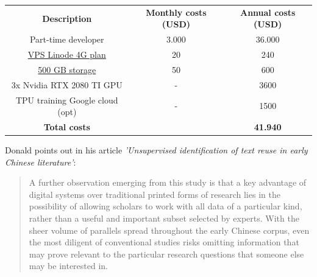 \begin{tabular}{ c c c }
 \textbf{Description} & \textbf{Monthly costs (USD)} & \textbf{Annual costs (USD)} \\ 
 Part-time developer & 3.000 & 36.000 \\  
 \href{https://www.linode.com/pricing}{VPS Linode 4G plan} & 20 & 240 \\
  \href{https://www.linode.com/blockstorage}{500 GB storage} & 50 & 600 \\
  3x Nvidia RTX 2080 TI GPU & - & 3600 \\
  TPU training Google cloud (opt) & - & 1500 \\
 \textbf{Total costs} & & \textbf{41.940}
\end{tabular}


Donald \cite{sturgeon2017} points out in his article {\em 'Unsupervised identification of text reuse in early Chinese literature'}: 

\begin{quote}
A further observation emerging from this study is that a key advantage of digital systems over traditional printed forms of research lies in the possibility of allowing scholars to work with all data of a particular kind, rather than a useful and important subset selected by experts. With the sheer volume of parallels spread throughout the early Chinese corpus, even the most diligent of conventional studies risks omitting information that may prove relevant to the particular research questions that someone else may be interested in.
\end{quote}
